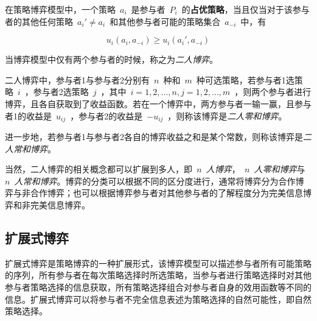 \begin{definition}
	在策略博弈模型中，一个策略~$a_i$~是参与者~$P_i$~的\textbf{占优策略}，当且仅当对于该参与者的其他任何策略~$a_i'\neq a_i$~和其他参与者可能的策略集合~$a_{-i}$~中，有
	
	\begin{equation}
	u_i(a_i,a_{-i}) \geq 	u_i(a_i',a_{-i})
	\end{equation}
\end{definition}

\begin{definition}
	当博弈模型中仅有两个参与者的时候，称之为\textit{二人博弈}。
\end{definition}



\begin{definition}
二人博弈中，参与者1与参与者2分别有~$n$~种和~$m$~种可选策略，若参与者1选策略~$i$~，参与者2选策略~$j$~，其中~$i=1,2,...,n,j=1,2,...,m$~，则两个参与者进行博弈，且各自获取到了收益函数。若在一个博弈中，两方参与者一输一赢，且参与者1的收益是~$u_{ij}$~，参与者2的收益是~$-u_{ij}$~，则称该博弈是\textit{二人零和博弈}。
\end{definition}

\begin{definition}
	进一步地，若参与者1与参与者2各自的博弈收益之和是某个常数，则称该博弈是\textit{二人常和博弈}。
\end{definition}

当然，二人博弈的相关概念都可以扩展到多人，即\textit{~$n$~人博弈}，\textit{~$n$~人零和博弈}与\textit{~$n$~人常和博弈}。博弈的分类可以根据不同的区分度进行，通常将博弈分为合作博弈与非合作博弈；也可以根据博弈参与者对其他参与者的了解程度分为完美信息博弈和非完美信息博弈。



\subsection{扩展式博弈}

扩展式博弈是策略博弈的一种扩展形式，该博弈模型可以描述参与者所有可能策略的序列，所有参与者在每次策略选择时所选策略，当参与者进行策略选择时对其他参与者策略选择的信息获取，所有策略选择组合对参与者自身的效用函数等不同的信息。扩展式博弈可以将参与者不完全信息表述为策略选择的自然可能性，即自然策略选择。

